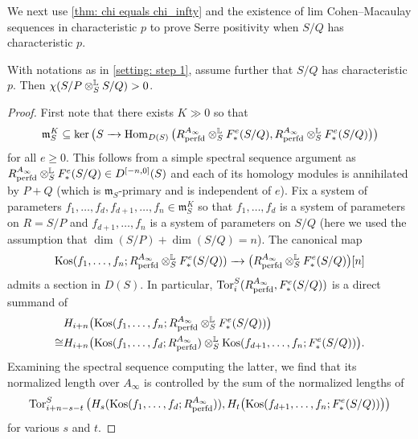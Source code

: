 \documentclass[12pt]{amsart}
\numberwithin{equation}{theorem}
\numberwithin{equation}{theorem}
\renewcommand{\m}{\mathfrak{m}}
\newcommand{\perfd}{\textnormal{perfd}}
\newcommand{\Kos}{\textnormal{Kos}}
\begin{document}
We next use \autoref{thm: chi equals chi_infty} and the existence of lim Cohen--Macaulay sequences in characteristic $p$ to prove Serre positivity when $S/Q$ has characteristic $p$.

\begin{theorem}
\label{thm: S/Q has char p}
With notations as in \autoref{setting: step 1}, assume further that $S/Q$ has characteristic $p$. Then $\chi(S/P \otimes^{\mathbb{L}}_S S/Q)>0$.  
\end{theorem}
\begin{proof}
First note that there exists $K\gg 0$ so that 
$$\m_S^K\subseteq \ker\big(S\to \Hom_{D(S)}\big(R^{A_\infty}_\perfd\otimes^\myL_S F^e_*(S/Q), R^{A_\infty}_\perfd\otimes^\myL_S F^e_*(S/Q)\big)\big)$$
for all $e\geq 0$. This follows from a simple spectral sequence argument as $R^{A_\infty}_\perfd\otimes^\myL_S F^e_*(S/Q)\in D^{[-n,0]}(S)$ and each of its homology modules is annihilated by $P+Q$ (which is $\m_S$-primary and is independent of $e$). Fix a system of parameters $f_1,\dots,f_d, f_{d+1},\dots, f_n \in \m_S^K$ so that $f_1,\dots,f_d$ is a system of parameters on $R=S/P$ and $f_{d+1},\dots,f_n$ is a system of parameters on $S/Q$ (here we used the assumption that $\dim(S/P)+\dim(S/Q)=n$). The canonical map 
$$\Kos(f_1,\dots,f_n; R^{A_\infty}_\perfd\otimes^\myL_SF^e_*(S/Q)) \to \big(R^{A_\infty}_\perfd\otimes^\myL_SF^e_*(S/Q)\big)[n]$$
admits a section in $D(S)$. In particular, $\Tor_i^S(R^{A_\infty}_\perfd, F^e_*(S/Q))$ is a direct summand of 
\begin{align*}
& H_{i+n}\big(\Kos(f_1,\dots,f_n; R^{A_\infty}_\perfd \otimes^\myL_SF^e_*(S/Q))\big) \\
\cong & H_{i+n}\big(\Kos(f_1,\dots,f_d; R^{A_\infty}_\perfd) \otimes^\myL_S \Kos(f_{d+1},\dots, f_n; F^e_*(S/Q))\big).
\end{align*}
Examining the spectral sequence computing the latter, we find that its normalized length over $A_\infty$ is controlled by the sum of the normalized lengths of 
\begin{equation}
\label{eqn: Tor lim CM}
\Tor_{i+n-s-t}^S\big(H_s(\Kos(f_1,\dots,f_d; R^{A_\infty}_\perfd)), H_t\big(\Kos(f_{d+1},\dots, f_n; F^e_*(S/Q))\big)\big)
\end{equation}
for various $s$ and $t$. 


\end{proof}
\end{document}
